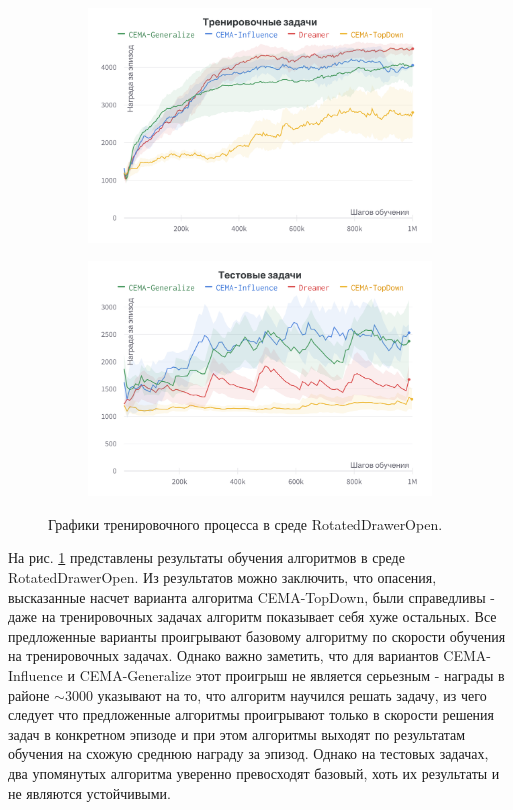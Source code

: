 \begin{figure}[t]
    \centering
    \begin{subfigure}{.47\textwidth}
        \centering
        \includegraphics[width=\linewidth]{figures/rdw_train.png}
    \end{subfigure}
    \begin{subfigure}{.47\textwidth}
        \centering
        \includegraphics[width=\linewidth]{figures/rdw_test.png}
    \end{subfigure}
    \caption{Графики тренировочного процесса в среде RotatedDrawerOpen.}
    \label{fig:rdw_res}
\end{figure}

На рис. \ref{fig:rdw_res} представлены результаты обучения алгоритмов в среде RotatedDrawerOpen.
Из результатов можно заключить, что опасения, высказанные насчет варианта алгоритма CEMA-TopDown, были справедливы - даже на тренировочных задачах алгоритм показывает себя хуже остальных.
Все предложенные варианты проигрывают базовому алгоритму по скорости обучения на тренировочных задачах.
Однако важно заметить, что для вариантов CEMA-Influence и CEMA-Generalize этот проигрыш не является серьезным - награды в районе $\sim3000$ указывают на то, что алгоритм научился решать задачу, из чего следует что предложенные алгоритмы проигрывают только в скорости решения задач в конкретном эпизоде и при этом алгоритмы выходят по результатам обучения на схожую среднюю награду за эпизод.
Однако на тестовых задачах, два упомянутых алгоритма уверенно превосходят базовый, хоть их результаты и не являются устойчивыми.


